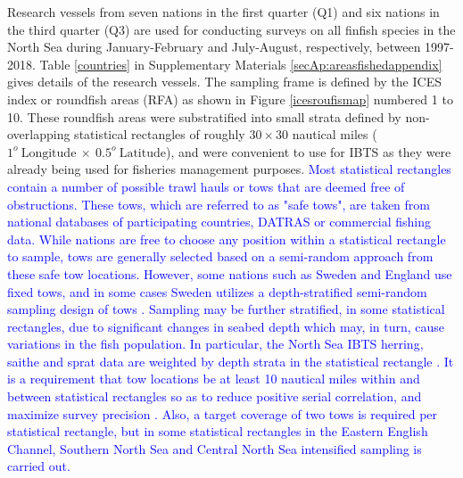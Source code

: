\documentclass[a4paper 12pt]{article}
\numberwithin{equation}{section}
\newcommand{\nat}[1]{\textcolor{blue}{#1}}
\begin{document}
Research vessels from seven nations in the first quarter (Q1) and six nations in the third quarter (Q3) are used for conducting surveys on all finfish species in the North Sea during January-February and July-August, respectively, between 1997-2018. Table \ref{countries} in Supplementary Materials \ref{secAp:areasfishedappendix} gives details of the research vessels. The sampling frame is defined by the ICES index or roundfish areas (RFA) as shown in Figure \ref{icesroufismap} numbered 1 to 10. These  roundfish areas were substratified into small strata defined by non-overlapping statistical rectangles of roughly $30 \times 30$ nautical miles ($1^{o} \  \mathrm{Longitude} \ \times  \  0.5^{o} \ \mathrm{Latitude}$), and were convenient to use for IBTS as they were already being used for fisheries management purposes. \nat{Most statistical rectangles contain a number of possible trawl hauls or tows that are deemed free of obstructions. These tows, which are referred to as   "safe tows", are taken from national databases of participating countries, DATRAS \citep{datras} or commercial fishing data. While nations are free to choose any position within a statistical rectangle to sample, tows are generally selected based on a semi-random approach from these safe tow locations. However, some nations such as Sweden and England use fixed tows, and in some cases Sweden utilizes a depth-stratified semi-random sampling design of tows \citep{ICES2018}. Sampling may be further stratified, in some statistical rectangles, due to significant changes in seabed depth which may, in turn, cause variations in the fish population. In particular, the North Sea IBTS herring, saithe and sprat data are weighted by depth strata in the statistical rectangle \citep{ICES2013}. It is a requirement that tow locations be at least 10 nautical miles within and between statistical rectangles so as to reduce positive serial correlation, and maximize survey precision \citep{ICES2018}. Also, a target coverage of two tows is required per statistical rectangle\citep{ICES2015}, but in some statistical rectangles in the Eastern English Channel, Southern North Sea and Central North Sea intensified sampling is carried out.}
\end{document}
